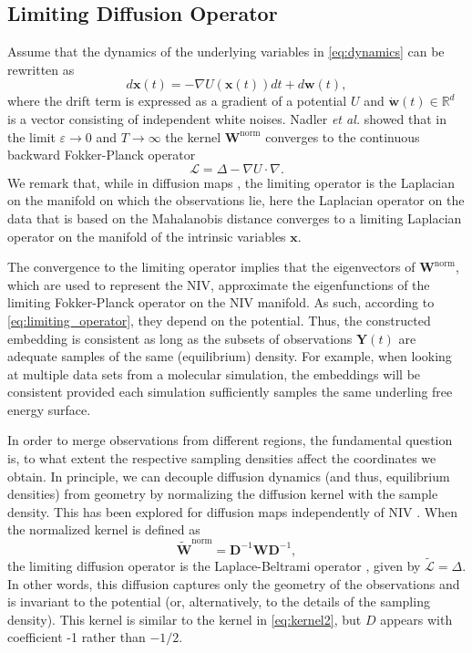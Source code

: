 \subsection{Limiting Diffusion Operator} \label{sec:diff_limit}
Assume that the dynamics of the underlying variables in \eqref{eq:dynamics} can be rewritten as
\begin{equation} \label{eq:Langevin}
	d\mathbf{x}(t) = - \nabla U(\mathbf{x}(t)) dt + d \mathbf{w}(t),
\end{equation}
where the drift term is expressed as a gradient of a potential $U$ and $\dot{\mathbf{w}}(t) \in \mathbb{R}^d$ is a vector consisting of independent white noises.
%
Nadler {\em et al.} \cite{nadler2006diffusion} showed that in the limit $\varepsilon \rightarrow 0$ and $T \rightarrow \infty$ the kernel $\mathbf{W}^{\mathrm{norm}}$ converges to the continuous backward Fokker-Planck operator
\begin{equation}
	\mathcal{L} = \Delta - \nabla U \cdot \nabla.
	\label{eq:limiting_operator}
\end{equation}
%
We remark that, while in diffusion maps \cite{coifman2005geometric}, the limiting operator is the Laplacian on the manifold on which the observations lie,
here the Laplacian operator on the data that is based on the Mahalanobis distance converges to a limiting Laplacian operator on the
manifold of the intrinsic variables $\mathbf{x}$.

The convergence to the limiting operator implies that the eigenvectors of $\mathbf{W}^{\mathrm{norm}}$, which are used to represent the NIV, approximate the eigenfunctions of the limiting Fokker-Planck operator on the NIV manifold.
%
As such, according to \eqref{eq:limiting_operator}, they depend on the potential.
%
Thus, the constructed embedding is consistent as long as the subsets of observations $\mathbf{Y}(t)$ are
adequate samples of the same (equilibrium) density.
%
For example, when looking at multiple data sets from a molecular simulation, the embeddings will be consistent provided each simulation sufficiently samples the same underling free energy surface.

In order to merge observations from different regions,
the fundamental question is, to what extent the respective sampling densities affect the coordinates we obtain.
%
In principle, we can decouple diffusion dynamics (and thus, equilibrium densities)
from geometry by normalizing the diffusion kernel with the sample density.
%
This has been explored for diffusion maps independently of NIV \cite{coifman2005geometric}.
%
When the normalized kernel is defined as
\begin{equation} \label{eq:norm_kernel}
\widetilde{\mathbf{W}}^{\mathrm{norm}} = \mathbf{D}^{-1}\mathbf{W}\mathbf{D}^{-1},
\end{equation}
the limiting diffusion operator is the Laplace-Beltrami operator \cite{nadler2006diffusion}, given by $\widetilde{\mathcal{L}} = \Delta$.
%
In other words, this diffusion captures only the geometry of the observations and is invariant to the potential (or, alternatively,
to the details of the sampling density).
This kernel is similar to the kernel in \eqref{eq:kernel2}, but $D$ appears with coefficient -1 rather than $-1/2$.

